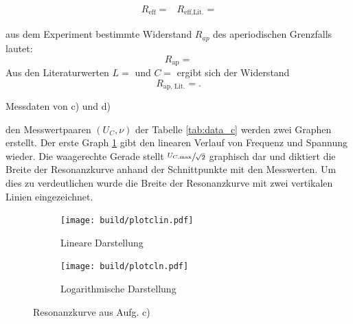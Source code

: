 \begin{align}
  &R_{\text{eff}}=\text{} 
  &R_{\text{eff,Lit.}}=\text{ }
\end{align}



  \justifying aus dem Experiment bestimmte Widerstand $R_{ap}$ des aperiodischen Grenzfalls lautet:
  \begin{equation}
  R_{\text{ap}} = \text{} \label{eq:Rap}
  \end{equation}
  Aus den Literaturwerten $L = \text{}$ und $C =\text{}$ ergibt sich der Widerstand 
  \begin{equation}
  R_{\text{ap, Lit.}} = \text{} \label{eq:RapLit}.
  \end{equation}


  \begin{table}[H]
        \centering
        \caption{Messdaten von c) und d)}
         
        \label{tab:data_c}
  \end{table}

  \justifying den Messwertpaaren $(U_C, \nu)$ der Tabelle \ref{tab:data_c} werden zwei Graphen erstellt. Der erste Graph \ref{fig:5clin} 
  gibt den linearen Verlauf von Frequenz und Spannung wieder. Die waagerechte Gerade stellt $\sfrac{U_{C,\text{max}}}{\sqrt{2}}$ graphisch dar und diktiert
  die Breite der Resonanzkurve anhand der Schnittpunkte mit den Messwerten. Um dies zu verdeutlichen wurde die Breite der Resonanzkurve mit zwei vertikalen 
  Linien eingezeichnet. 


  \begin{figure}[H]
    \begin{subfigure}{0.495\linewidth}
     \texttt{[image: build/plotclin.pdf]}
     \centering
     \caption{Lineare Darstellung}
     \label{fig:5clin}
    \end{subfigure}
    \begin{subfigure}{0.495\linewidth}
     \texttt{[image: build/plotcln.pdf]}
     \centering
     \caption{Logarithmische Darstellung}
     \label{fig:5cln}
    \end{subfigure}
    \caption{Resonanzkurve aus Aufg. c)}
  \end{figure} 

